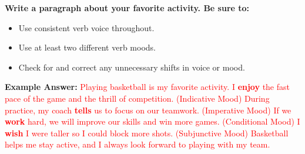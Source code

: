 \documentclass[12pt]{article}
\begin{document}
\begin{tcolorbox}[colframe=black!60, colback=white, 
coltitle=black, colbacktitle=black!15, fonttitle=\bfseries\Large, 
title=Exit Ticket, halign title=center, left=10pt, right=10pt, top=5pt, bottom=15pt]

\textbf{Write a paragraph about your favorite activity. Be sure to:}
\begin{itemize}
    \item Use consistent verb voice throughout.  
    \item Use at least two different verb moods.  
    \item Check for and correct any unnecessary shifts in voice or mood.  
\end{itemize}

\vspace{2em}

\textbf{Example Answer:}
\textcolor{red}{
Playing basketball is my favorite activity. I \textbf{enjoy} the fast pace of the game and the thrill of competition. (Indicative Mood) During practice, my coach \textbf{tells} us to focus on our teamwork. (Imperative Mood) If we \textbf{work} hard, we will improve our skills and win more games. (Conditional Mood) I \textbf{wish} I were taller so I could block more shots. (Subjunctive Mood) Basketball helps me stay active, and I always look forward to playing with my team.
}

\end{tcolorbox}
\end{document}

